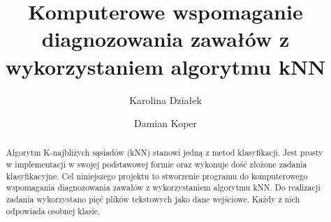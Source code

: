 \documentclass[runningheads]{llncs2e/llncs}
\begin{document}
\title{Komputerowe wspomaganie diagnozowania zawałów z wykorzystaniem algorytmu kNN}

%
%
\author{Karolina Działek \and
    Damian Koper
}
%
%
%
\maketitle              %
%
\begin{abstract}
    Algorytm K-najbliżych sąsiadów (kNN) stanowi jedną z metod klasyfikacji. Jest prosty w implementacji w swojej podstawowej formie oraz wykonuje dość złożone zadania klasyfikacyjne. Cel niniejszego projektu to stworzenie programu do komputerowego wspomagania diagnozowania zawałów z wykorzystaniem algorytmu kNN. Do realizacji zadania wykorzystano pięć plików tekstowych jako dane wejściowe. Każdy z nich odpowiada osobnej klasie.

\end{abstract}
%



\clearpage
%
%
%


%
\end{document}
